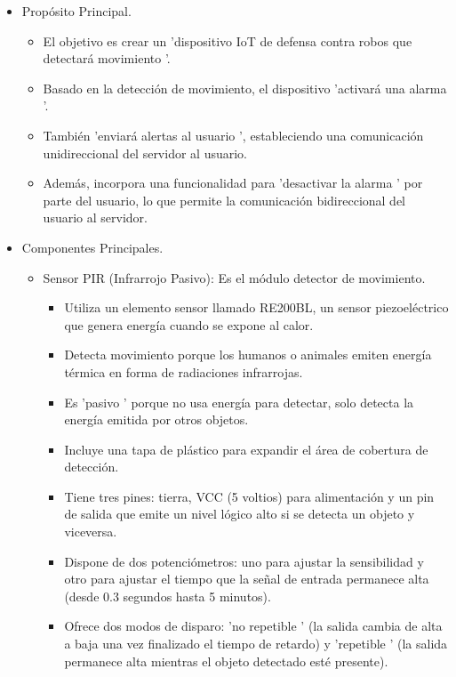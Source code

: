 \documentclass{report}
\begin{document}
\begin{itemize}
\item Propósito Principal.
    \begin{itemize}
        \item El objetivo es crear un  'dispositivo IoT de defensa contra robos que detectará movimiento '.
        \item Basado en la detección de movimiento, el dispositivo  'activará una alarma '.
        \item También  'enviará alertas al usuario ', estableciendo una comunicación unidireccional del servidor al usuario.
        \item Además, incorpora una funcionalidad para  'desactivar la alarma ' por parte del usuario, lo que permite la comunicación bidireccional del 
        usuario al servidor.
    \end{itemize}
\item Componentes Principales.
    \begin{itemize}
        \item Sensor PIR (Infrarrojo Pasivo): Es el módulo detector de movimiento.
        \begin{itemize}
            \item Utiliza un elemento sensor llamado RE200BL, un sensor piezoeléctrico que genera energía cuando se expone al calor.
            \item Detecta movimiento porque los humanos o animales emiten energía térmica en forma de radiaciones infrarrojas.
            \item Es  'pasivo ' porque no usa energía para detectar, solo detecta la energía emitida por otros objetos.
            \item Incluye una tapa de plástico para expandir el área de cobertura de detección.
            \item Tiene tres pines: tierra, VCC (5 voltios) para alimentación y un pin de salida que emite un nivel lógico alto si se detecta un objeto 
            y viceversa.
            \item Dispone de dos potenciómetros: uno para ajustar la sensibilidad y otro para ajustar el tiempo que la señal de entrada permanece alta 
            (desde 0.3 segundos hasta 5 minutos).
            \item Ofrece  dos modos de disparo:  'no repetible ' (la salida cambia de alta a baja una vez finalizado el tiempo de retardo) y  'repetible ' 
            (la salida permanece alta mientras el objeto detectado esté presente).

\end{itemize}
\end{itemize}
\end{itemize}
\end{document}
